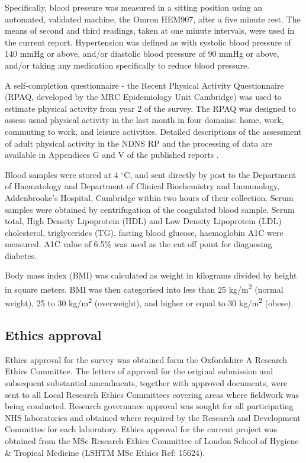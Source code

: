 Specifically, blood pressure was measured in a sitting position using an automated, validated machine, the Omron HEM907, after a five minute rest. The means of second and third readings, taken at one minute intervals, were used in the current report. Hypertension was defined as with systolic blood pressure of 140 mmHg or above, and/or diastolic blood pressure of 90 mmHg or above, and/or taking any medication specifically to reduce blood pressure. 

A self-completion questionnaire - the Recent Physical Activity Questionnaire  \parencite{besson2009estimating} (RPAQ, developed by the MRC Epidemiology Unit Cambridge) was used to estimate physical activity from year 2 of the survey. The RPAQ was designed to assess usual physical activity in the last month in four domains: home, work, commuting to work, and leisure activities. Detailed descriptions of the assessment of adult physical activity in the NDNS RP and the processing of data are available in Appendices G and V of the published reports \parencite{bates2014national,roberts2018national,NDNSofficial}. 

Blood samples were stored at 4 $^\circ$C, and sent directly by post to the Department of Haematology and Department of Clinical Biochemistry and Immunology, Addenbrooke's Hospital, Cambridge within two hours of their collection. Serum samples were obtained by centrifugation of the coagulated blood sample. Serum total, High Density Lipoprotein (HDL) and Low Density Lipoprotein (LDL) cholesterol, triglycerides (TG), fasting blood glucose, haemoglobin A1C were measured. A1C value of 6.5\% was used as the cut off point for diagnosing diabetes.

Body mass index (BMI) was calculated as weight in kilograms divided by height in square meters. BMI was then categorised into less than 25 kg/m\textsuperscript{2} (normal weight), 25 to 30 kg/m\textsuperscript{2} (overweight), and higher or equal to 30 kg/m\textsuperscript{2} (obese). 

\subsection{Ethics approval}\vspace{-0.3cm}

Ethics approval for the survey was obtained form the Oxfordshire A Research Ethics Committee. The letters of approval for the original submission and subsequent substantial amendments, together with approved documents, were sent to all Local Research Ethics Committees covering areas where fieldwork was being conducted. Research governance approval was sought for all participating NHS laboratories and obtained where required by the Research and Development Committee for each laboratory. Ethics approval for the current project was obtained from the MSc Research Ethics Committee of London School of Hygiene \& Tropical Medicine (LSHTM MSc Ethics Ref: 15624). 


